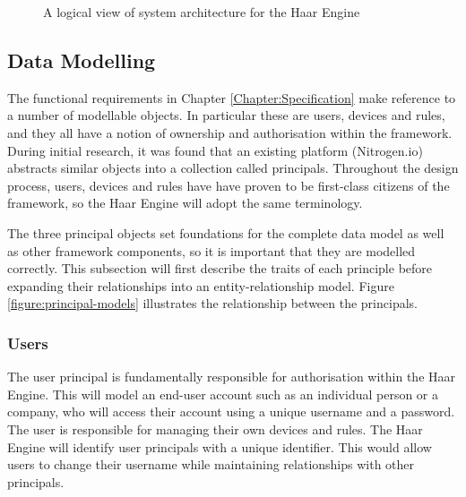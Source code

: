     \begin{figure}
    \centering
    \caption{A logical view of system architecture for the Haar Engine}\label{figure:framework-architecture}
  \end{figure}

    \subsection{Data Modelling}
      The functional requirements in Chapter \ref{Chapter:Specification} make reference to a number of modellable objects. In particular these are users, devices and rules, and they all have a notion of ownership and authorisation within the framework. During initial research, it was found that an existing platform (Nitrogen.io) abstracts similar objects into a collection called principals. Throughout the design process, users, devices and rules have have proven to be first-class citizens of the framework, so the Haar Engine will adopt the same terminology.

      The three principal objects set foundations for the complete data model as well as other framework components, so it is important that they are modelled correctly. This subsection will first describe the traits of each principle before expanding their relationships into an entity-relationship model. Figure \ref{figure:principal-models} illustrates the relationship between the principals.

      \subsubsection{Users}
        The user principal is fundamentally responsible for authorisation within the Haar Engine. This will model an end-user account such as an individual person or a company, who will access their account using a unique username and a password. The user is responsible for managing their own devices and rules. The Haar Engine will identify user principals with a unique identifier. This would allow users to change their username while maintaining relationships with other principals.

